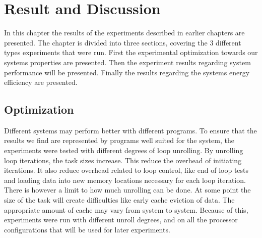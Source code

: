 \chapter[Result and Discussion]{Result and Discussion}
In this chapter the results of the experiments described in earlier chapters are presented.
The chapter is divided into three sections, covering the 3 different types experiments that were run.
First the experimental optimization towards our systems properties are presented.
Then the experiment results regarding system performance will be presented.
Finally the results regarding the systems energy efficiency are presented.

\section{Optimization}
Different systems may perform better with different programs.
To ensure that the results we find are represented by programs well suited for the system, the experiments were tested with different degrees of loop unrolling.
By unrolling loop iterations, the task sizes increase.
This reduce the overhead of initiating iterations.
It also reduce overhead related to loop control, like end of loop tests and loading data into new memory locations necessary for each loop iteration.
There is however a limit to how much unrolling can be done.
At some point the size of the task will create difficulties like early cache eviction of data.
The appropriate amount of cache may vary from system to system.
Because of this, experiments were run with different unroll degrees, and on all the processor configurations that will be used for later experiments.

